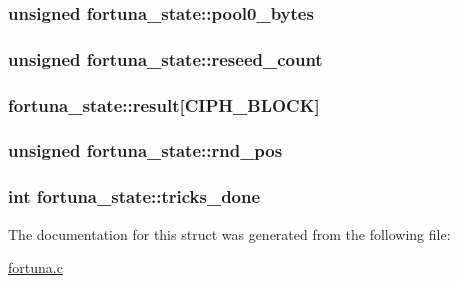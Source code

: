 \hypertarget{structfortuna__state_aaf71b2ed6c86a11f8abbe5ee3277c4a5}{
\subsubsection[{pool0\-\_\-bytes}]{\setlength{\rightskip}{0pt plus 5cm}unsigned fortuna\-\_\-state\-::pool0\-\_\-bytes}}\label{structfortuna__state_aaf71b2ed6c86a11f8abbe5ee3277c4a5}
\hypertarget{structfortuna__state_aa8237da33b2f2838320097ed06837879}{
\subsubsection[{reseed\-\_\-count}]{\setlength{\rightskip}{0pt plus 5cm}unsigned fortuna\-\_\-state\-::reseed\-\_\-count}}\label{structfortuna__state_aa8237da33b2f2838320097ed06837879}
\hypertarget{structfortuna__state_a6331223fd25966c963e9cc2b6051d8ae}{
\subsubsection[{result}]{ fortuna\-\_\-state\-::result\mbox{[}{\bf C\-I\-P\-H\-\_\-\-B\-L\-O\-C\-K}\mbox{]}}}\label{structfortuna__state_a6331223fd25966c963e9cc2b6051d8ae}
\hypertarget{structfortuna__state_a6b390be97975dff29c08c06ecf1bdb3a}{
\subsubsection[{rnd\-\_\-pos}]{\setlength{\rightskip}{0pt plus 5cm}unsigned fortuna\-\_\-state\-::rnd\-\_\-pos}}\label{structfortuna__state_a6b390be97975dff29c08c06ecf1bdb3a}
\hypertarget{structfortuna__state_a4ea7c5da5396b8f797f36993a98de5fe}{
\subsubsection[{tricks\-\_\-done}]{\setlength{\rightskip}{0pt plus 5cm}int fortuna\-\_\-state\-::tricks\-\_\-done}}\label{structfortuna__state_a4ea7c5da5396b8f797f36993a98de5fe}


The documentation for this struct was generated from the following file\-:\begin{DoxyCompactItemize}
\item 
\hyperlink{fortuna_8c}{fortuna.\-c}\end{DoxyCompactItemize}
